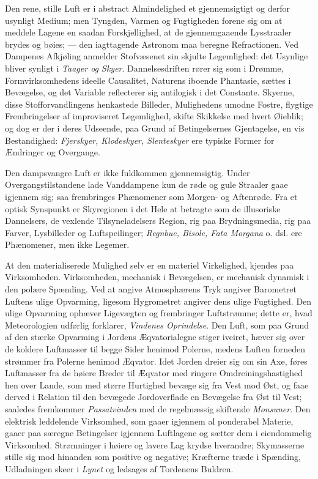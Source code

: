 \documentclass[12pt,a4paper]{book}
\begin{document}
Den rene, stille Luft er i abstract Almindelighed et gjennemsigtigt og
derfor usynligt Medium; men Tyngden, Varmen og Fugtigheden forene sig om
at meddele Lagene en saadan Forskjellighed, at de gjennemgaaende
Lysstraaler brydes og bøies; --- den iagttagende Astronom maa beregne
Refractionen. Ved Dampenes Afkjøling anmelder Stofvæsenet sin skjulte
Legemlighed: det Usynlige bliver synligt i \emph{Taager og Skyer}.
Dannelsesdriften rører sig som i Drømme, Formvirksomhedens ideelle
Causalitet, Naturens iboende Phantasie, sættes i Bevægelse, og det
Variable reflecterer sig antilogisk i det Constante. Skyerne, disse
Stofforvandlingens henkastede Billeder, Mulighedens umodne
Fostre, flygtige Frembringelser af improviseret Legemlighed, skifte
Skikkelse med hvert Øieblik; og dog er der i deres Udseende, paa Grund af
Betingelsernes Gjentagelse, en vis Bestandighed: \emph{Fjerskyer,
Klodeskyer, Slenteskyer} ere typiske Former for Ændringer og Overgange.

Den dampsvangre Luft er ikke fuldkommen gjennemsigtig. Under
Overgangstilstandene lade Vanddampene kun de røde og gule Straaler gaae
igjennem sig; saa frembringes Phænomener som Morgen- og Aftenrøde. Fra et
optisk Synspunkt er Skyregionen i det Hele at betragte som de
illusoriske Dannelsers, de vexlende Tilsyneladelsers Region, rig paa
Brydningsmedia, rig paa Farver, Lysbilleder og Luftspeilinger;
\emph{Regnbue, Bisole, Fata Morgana} o. dsl. ere Phænomener, men ikke
Legemer.

At den materialiserede Mulighed selv er en materiel Virkelighed, kjendes
paa Virksomheden. Virksomheden, mechanisk i Bevægelsen, er mechanisk
dynamisk i den polære Spænding. Ved at angive Atmosphærens Tryk angiver
Barometret Luftens ulige Opvarming, ligesom Hygrometret angiver dens
ulige Fugtighed. Den ulige Opvarming ophæver Ligevægten og frembringer
Luftstrømme; dette er, hvad Meteorologien udførlig forklarer,
\emph{Vindenes Oprindelse}. Den Luft, som paa Grund af den stærke
Opvarming i Jordens Æqvatorialegne stiger iveiret, hæver sig over de
koldere Luftmasser til begge Sider henimod Polerne, medens Luften
forneden strømmer fra Polerne henimod Æqvator. Idet Jorden dreier sig om
sin Axe, føres Luftmasser fra de høiere Breder til Æqvator med ringere
Omdreiningshastighed hen over Lande, som med større Hurtighed bevæge sig
fra Vest mod Øst, og faae derved i Relation til den bevægede
Jordoverflade en Bevægelse fra Øst til Vest; saaledes fremkommer
\emph{Passatvinden} med de regelmæssig skiftende \emph{Monsuner}. Den
elektrisk leddelende Virksomhed, som gaaer igjennem al ponderabel
Materie, gaaer paa særegne Betingelser igjennem
Luftlagene og sætter dem i eiendommelig Virksomhed. Strømninger i høiere
og lavere Lag krydse hverandre; Skymasserne stille sig mod hinanden som
positive og negative; Kræfterne træde i Spænding, Udladningen skeer i
\emph{Lynet} og ledsages af Tordenens Buldren.
\end{document}
